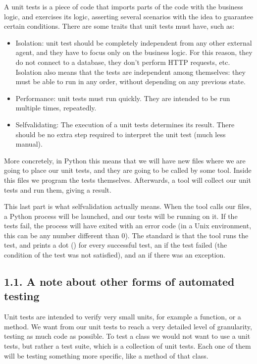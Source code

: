 \documentclass[a4paper,10pt,english]{sphinxmanual}
\begin{document}
A unit tests is a piece of code that imports parts of the code with the business logic, and
exercises its logic, asserting several scenarios with the idea to guarantee certain conditions.
There are some traits that unit tests must have, such as:
\begin{itemize}
\item {} 
Isolation: unit test should be completely independent from any other external agent, and they have to focus only on the business logic. For this reason, they do not connect to a database, they don’t perform HTTP requests, etc. Isolation also means that the tests are independent among themselves: they must be able to run in any order, without depending on any previous state.

\item {} 
Performance: unit tests must run quickly. They are intended to be run multiple times, repeatedly.

\item {} 
Self\sphinxhyphen{}validating: The execution of a unit tests determines its result. There should be no extra step required to interpret the unit test (much less manual).

\end{itemize}

More concretely, in Python this means that we will have new files where we are going
to place our unit tests, and they are going to be called by some tool. Inside this files we program the tests
themselves. Afterwards, a tool will collect our unit tests and run them, giving a result.

This last part is what self\sphinxhyphen{}validation actually means. When the tool calls our files, a Python
process will be launched, and our tests will be running on it. If the tests fail, the process will
have exited with an error code (in a Unix environment, this can be any number different
than 0). The standard is that the tool runs the test, and prints a dot () for every successful
test, an  if the test failed (the condition of the test was not satisfied), and an  if there was
an exception.


\subsection{1.1. A note about other forms of automated testing}
\label{\detokenize{chapters/8_unit_testing/index:a-note-about-other-forms-of-automated-testing}}
Unit tests are intended to verify very small units, for example a function, or a method. We
want from our unit tests to reach a very detailed level of granularity, testing as much code
as possible. To test a class we would not want to use a unit tests, but rather a test suite,
which is a collection of unit tests. Each one of them will be testing something more specific,
like a method of that class.
\end{document}
